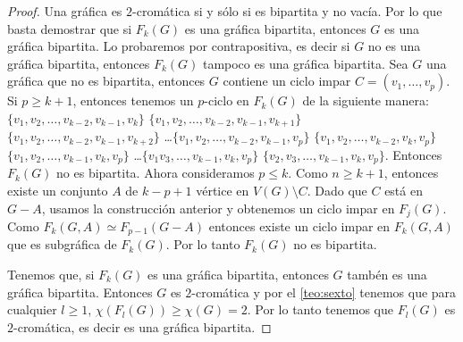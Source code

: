 \begin{proof}
    Una gr\'afica es $2$-crom\'atica si y s\'olo si es bipartita y no
    vac\'ia. Por lo que basta demostrar que si $F_k(G)$ es una gr\'afica
    bipartita, entonces $G$ es una gr\'afica bipartita. Lo probaremos por
    contrapositiva, es decir si $G$ no es una gr\'afica bipartita, entonces
    $F_k(G)$ tampoco es una gr\'afica bipartita. Sea $G$ una gr\'afica que
    no es bipartita, entonces $G$ contiene un ciclo impar $C=(v_1, \dots,
    v_p)$. Si $p \geq k+1$, entonces tenemos un $p$-ciclo en $F_k(G)$ de la
    siguiente manera: $\{v_1, v_2, \dots, v_{k-2}, v_{k-1}, v_k\}$ $\{v_1,
    v_2, \dots, v_{k-2}, v_{k-1}, v_{k+1}\}$ $\{v_1, v_2, \dots, v_{k-2},
    v_{k-1}, v_{k+2}\}$ \dots $\{v_1, v_2, \dots, v_{k-2}, v_{k-1}, v_p\}$
    $\{v_1, v_2, \dots, v_{k-2}, v_k, v_p\}$ $\{v_1, v_2, \dots, v_{k-1},
    v_k, v_p\}$ \dots $\{v_1 v_3, \dots, v_{k-1}, v_k, v_p\}$ $\{v_2, v_3,
    \dots, v_{k-1}, v_k, v_p\}$. Entonces $F_k(G)$ no es bipartita. Ahora
    consideramos $p \leq k$. Como $n \geq k+1$, entonces existe un conjunto
    $A$ de $k-p+1$ v\'ertice en $V(G)\setminus C$. Dado que $C$ est\'a en $G
    -A$, usamos la construcci\'on anterior y obtenemos un ciclo impar en
    $F_j(G)$. Como $F_k(G,A) \simeq F_{p-1}(G-A)$ entonces existe un ciclo
    impar en $F_k(G,A)$ que es subgr\'afica de $F_k(G)$. Por lo tanto
    $F_k(G)$ no es bipartita.

    Tenemos que, si $F_k(G)$ es una gr\'afica bipartita, entonces $G$
    tamb\'en es una gr\'afica bipartita. Entonces $G$ es $2$-crom\'atica y
    por el \cref*{teo:sexto} tenemos que para cualquier $l\geq 1$, $\chi
    (F_l(G)) \geq \chi (G)=2$. Por lo tanto tenemos que $F_l(G)$ es
    $2$-crom\'atica, es decir es una gr\'afica bipartita.
\end{proof}

